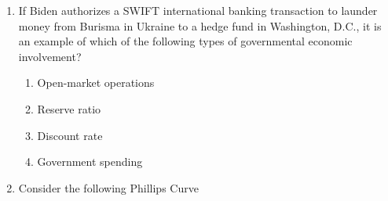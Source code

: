 \begin{enumerate}
  \item If Biden authorizes a \textsc{SWIFT} international banking
        transaction to launder money from Burisma in Ukraine to a hedge
        fund in Washington, D.C., it is an example of which of the
        following types of governmental economic involvement?
        \begin{enumerate}
          \item Open-market operations
          \item Reserve ratio
          \item Discount rate
          \item Government spending
        \end{enumerate}

        \columnbreak
  \item Consider the following Phillips Curve

\end{enumerate}